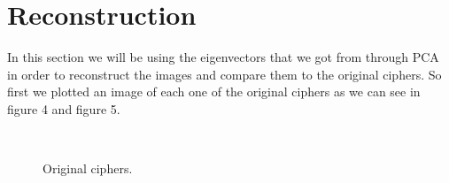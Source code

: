 \documentclass[paper=a4, fontsize=11pt]{scrartcl} %
\begin{document}
\section{Reconstruction}
In this section we will be using the eigenvectors that we got from through PCA in order to reconstruct the images and compare them to the original ciphers. So first we plotted an image of each one of the original ciphers as we can see in figure 4 and figure 5.
\begin{figure}[h]
    \centering
	\\
    
    \caption{Original ciphers.}
    \label{fig:ciph}
\end{figure}
\end{document}
